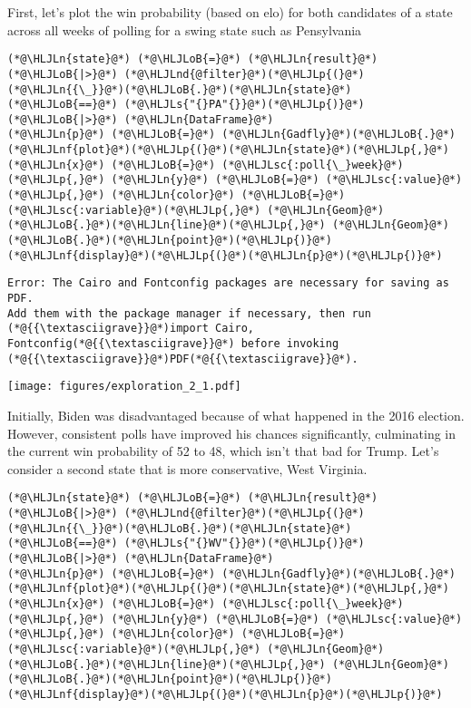 \documentclass[12pt,a4paper]{article}
\newcommand{\HLJLn}[1]{#1}
\newcommand{\HLJLnd}[1]{\textcolor[RGB]{214,102,97}{#1}}
\newcommand{\HLJLnf}[1]{\textcolor[RGB]{66,102,213}{#1}}
\newcommand{\HLJLs}[1]{\textcolor[RGB]{201,61,57}{#1}}
\newcommand{\HLJLsc}[1]{\textcolor[RGB]{201,61,57}{#1}}
\newcommand{\HLJLoB}[1]{\textcolor[RGB]{102,102,102}{\textbf{#1}}}
\newcommand{\HLJLp}[1]{#1}
\begin{document}
First, let's plot the win probability (based on elo) for both candidates of a state across all weeks of polling for a swing state such as Pensylvania   


\begin{lstlisting}
(*@\HLJLn{state}@*) (*@\HLJLoB{=}@*) (*@\HLJLn{result}@*) (*@\HLJLoB{|>}@*) (*@\HLJLnd{@filter}@*)(*@\HLJLp{(}@*)(*@\HLJLn{{\_}}@*)(*@\HLJLoB{.}@*)(*@\HLJLn{state}@*) (*@\HLJLoB{==}@*) (*@\HLJLs{"{}PA"{}}@*)(*@\HLJLp{)}@*) (*@\HLJLoB{|>}@*) (*@\HLJLn{DataFrame}@*)
(*@\HLJLn{p}@*) (*@\HLJLoB{=}@*) (*@\HLJLn{Gadfly}@*)(*@\HLJLoB{.}@*)(*@\HLJLnf{plot}@*)(*@\HLJLp{(}@*)(*@\HLJLn{state}@*)(*@\HLJLp{,}@*) (*@\HLJLn{x}@*) (*@\HLJLoB{=}@*) (*@\HLJLsc{:poll{\_}week}@*)(*@\HLJLp{,}@*) (*@\HLJLn{y}@*) (*@\HLJLoB{=}@*) (*@\HLJLsc{:value}@*)(*@\HLJLp{,}@*) (*@\HLJLn{color}@*) (*@\HLJLoB{=}@*) (*@\HLJLsc{:variable}@*)(*@\HLJLp{,}@*) (*@\HLJLn{Geom}@*)(*@\HLJLoB{.}@*)(*@\HLJLn{line}@*)(*@\HLJLp{,}@*) (*@\HLJLn{Geom}@*)(*@\HLJLoB{.}@*)(*@\HLJLn{point}@*)(*@\HLJLp{)}@*)
(*@\HLJLnf{display}@*)(*@\HLJLp{(}@*)(*@\HLJLn{p}@*)(*@\HLJLp{)}@*)
\end{lstlisting}

\begin{lstlisting}
Error: The Cairo and Fontconfig packages are necessary for saving as PDF.
Add them with the package manager if necessary, then run (*@{{\textasciigrave}}@*)import Cairo,
Fontconfig(*@{{\textasciigrave}}@*) before invoking (*@{{\textasciigrave}}@*)PDF(*@{{\textasciigrave}}@*).
\end{lstlisting}

\texttt{[image: figures/exploration\_2\_1.pdf]}

Initially, Biden was disadvantaged because of what happened in the 2016 election. However, consistent polls have improved his chances significantly, culminating in the current win probability of 52 to 48, which isn't that bad for Trump.  Let's consider a second state that is more conservative, West Virginia.  


\begin{lstlisting}
(*@\HLJLn{state}@*) (*@\HLJLoB{=}@*) (*@\HLJLn{result}@*) (*@\HLJLoB{|>}@*) (*@\HLJLnd{@filter}@*)(*@\HLJLp{(}@*)(*@\HLJLn{{\_}}@*)(*@\HLJLoB{.}@*)(*@\HLJLn{state}@*) (*@\HLJLoB{==}@*) (*@\HLJLs{"{}WV"{}}@*)(*@\HLJLp{)}@*) (*@\HLJLoB{|>}@*) (*@\HLJLn{DataFrame}@*)
(*@\HLJLn{p}@*) (*@\HLJLoB{=}@*) (*@\HLJLn{Gadfly}@*)(*@\HLJLoB{.}@*)(*@\HLJLnf{plot}@*)(*@\HLJLp{(}@*)(*@\HLJLn{state}@*)(*@\HLJLp{,}@*) (*@\HLJLn{x}@*) (*@\HLJLoB{=}@*) (*@\HLJLsc{:poll{\_}week}@*)(*@\HLJLp{,}@*) (*@\HLJLn{y}@*) (*@\HLJLoB{=}@*) (*@\HLJLsc{:value}@*)(*@\HLJLp{,}@*) (*@\HLJLn{color}@*) (*@\HLJLoB{=}@*) (*@\HLJLsc{:variable}@*)(*@\HLJLp{,}@*) (*@\HLJLn{Geom}@*)(*@\HLJLoB{.}@*)(*@\HLJLn{line}@*)(*@\HLJLp{,}@*) (*@\HLJLn{Geom}@*)(*@\HLJLoB{.}@*)(*@\HLJLn{point}@*)(*@\HLJLp{)}@*) 
(*@\HLJLnf{display}@*)(*@\HLJLp{(}@*)(*@\HLJLn{p}@*)(*@\HLJLp{)}@*)
\end{lstlisting}
\end{document}
